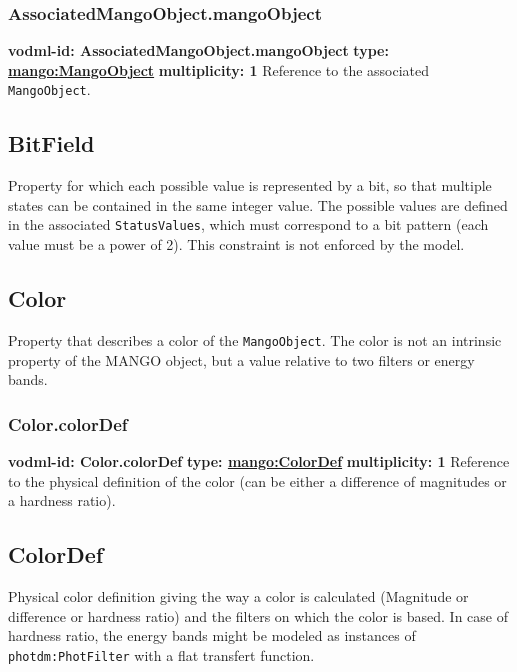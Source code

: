     \subsubsection{AssociatedMangoObject.mangoObject}
      \textbf{vodml-id: AssociatedMangoObject.mangoObject} \newline
      \textbf{type: \hyperref[sect:MangoObject]{mango:MangoObject}} \newline
      \textbf{multiplicity: 1} \newline 
      Reference to the associated \texttt{MangoObject}.

  \subsection{BitField}
  \label{sect:BitField}
    Property for which each possible value is represented by a bit, so that multiple states can be contained in the same integer value. The possible values are defined in the associated \texttt{StatusValues}, which must correspond to a bit pattern (each value must be a power of 2). This constraint is not enforced by the model.

  \subsection{Color}
  \label{sect:Color}
    Property that describes a color of the \texttt{MangoObject}. The color is not an intrinsic property of the MANGO object, but a value relative to two filters or energy bands.

    \subsubsection{Color.colorDef}
      \textbf{vodml-id: Color.colorDef} \newline
      \textbf{type: \hyperref[sect:ColorDef]{mango:ColorDef}} \newline
      \textbf{multiplicity: 1} \newline 
      Reference to the physical definition of the color (can be either a difference of magnitudes or a hardness ratio).

  \subsection{ColorDef}
  \label{sect:ColorDef}
    Physical color definition giving the way a color is calculated (Magnitude or difference or hardness ratio) and the filters on which the color is based. In case of hardness ratio, the energy bands might be modeled as instances of \texttt{photdm:PhotFilter} with a flat transfert function.

